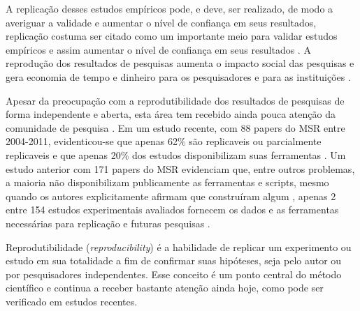 A replicação desses estudos empíricos pode, e deve, ser realizado, de modo a
averiguar a validade e aumentar o nível de confiança em seus resultados,
replicação costuma ser citado como um importante meio para validar estudos
empíricos e assim aumentar o nível de confiança em seus resultados
\cite{Almqvist2006}. A reprodução dos resultados de pesquisas aumenta o impacto
social das pesquisas e gera economia de tempo e dinheiro para os pesquisadores
e para as instituições \cite{Nesta2010}.

Apesar da preocupação com a reprodutibilidade dos resultados de pesquisas de
forma independente \cite{Stodden2009} e aberta, esta área tem recebido ainda
pouca atenção da comunidade de pesquisa \cite{Nancy2015, Grand2010Open}. Em um
estudo recente, com 88 papers do MSR entre 2004-2011, evidenticou-se que apenas
62\% são replicaveis ou parcialmente replicaveis e que apenas 20\% dos estudos
disponibilizam suas ferramentas \cite{amann2015software}. Um estudo anterior
com 171 papers do MSR evidenciam que, entre outros problemas, a maioria não
disponibilizam publicamente as ferramentas e scripts, mesmo quando os autores
explicitamente afirmam que construíram algum \cite{robles2010replicating},
apenas 2 entre 154 estudos experimentais avaliados fornecem os dados e as
ferramentas necessárias para replicação e futuras pesquisas
\cite{barr2010shoulders}.

Reprodutibilidade ({\it reproducibility}) é a habilidade de replicar um experimento
ou estudo em sua totalidade a fim de confirmar suas hipóteses, seja pelo
autor ou por pesquisadores independentes. Esse conceito é um ponto
central do método científico e continua a receber bastante atenção ainda hoje,
como pode ser verificado em estudos recentes.

%

